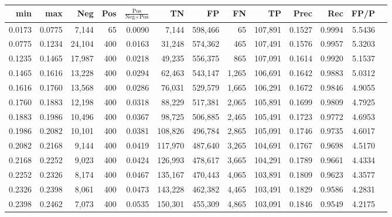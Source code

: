 \begin{tabular}{rrrrrrrrrrrrr}
\toprule
   min &    max &    Neg & Pos & $\frac{\text{Pos}}{\text{Neg}+\text{Pos}}$ &      TN &      FP &      FN &      TP &   Prec &    Rec &   FP/P \\
\midrule
0.0173 & 0.0775 &  7,144 &  65 &                                     0.0090 &   7,144 & 598,466 &      65 & 107,891 & 0.1527 & 0.9994 & 5.5436 \\
0.0775 & 0.1234 & 24,104 & 400 &                                     0.0163 &  31,248 & 574,362 &     465 & 107,491 & 0.1576 & 0.9957 & 5.3203 \\
0.1235 & 0.1465 & 17,987 & 400 &                                     0.0218 &  49,235 & 556,375 &     865 & 107,091 & 0.1614 & 0.9920 & 5.1537 \\
0.1465 & 0.1616 & 13,228 & 400 &                                     0.0294 &  62,463 & 543,147 &   1,265 & 106,691 & 0.1642 & 0.9883 & 5.0312 \\
0.1616 & 0.1760 & 13,568 & 400 &                                     0.0286 &  76,031 & 529,579 &   1,665 & 106,291 & 0.1672 & 0.9846 & 4.9055 \\
0.1760 & 0.1883 & 12,198 & 400 &                                     0.0318 &  88,229 & 517,381 &   2,065 & 105,891 & 0.1699 & 0.9809 & 4.7925 \\
0.1883 & 0.1986 & 10,496 & 400 &                                     0.0367 &  98,725 & 506,885 &   2,465 & 105,491 & 0.1723 & 0.9772 & 4.6953 \\
0.1986 & 0.2082 & 10,101 & 400 &                                     0.0381 & 108,826 & 496,784 &   2,865 & 105,091 & 0.1746 & 0.9735 & 4.6017 \\
0.2082 & 0.2168 &  9,144 & 400 &                                     0.0419 & 117,970 & 487,640 &   3,265 & 104,691 & 0.1767 & 0.9698 & 4.5170 \\
0.2168 & 0.2252 &  9,023 & 400 &                                     0.0424 & 126,993 & 478,617 &   3,665 & 104,291 & 0.1789 & 0.9661 & 4.4334 \\
0.2252 & 0.2326 &  8,174 & 400 &                                     0.0467 & 135,167 & 470,443 &   4,065 & 103,891 & 0.1809 & 0.9623 & 4.3577 \\
0.2326 & 0.2398 &  8,061 & 400 &                                     0.0473 & 143,228 & 462,382 &   4,465 & 103,491 & 0.1829 & 0.9586 & 4.2831 \\
0.2398 & 0.2462 &  7,073 & 400 &                                     0.0535 & 150,301 & 455,309 &   4,865 & 103,091 & 0.1846 & 0.9549 & 4.2175 \\

\end{tabular}
